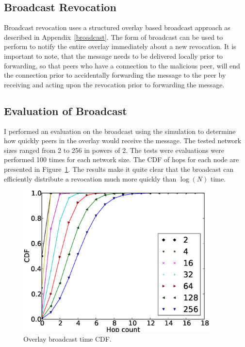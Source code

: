 \subsection{Broadcast Revocation}

Broadcast revocation uses a structured overlay based broadcast approach as
described in Appendix~\ref{broadcast}.  The form of broadcast can be used to
perform to notify the entire overlay immediately about a new revocation.  It is
important to note, that the message needs to be delivered locally prior to
forwarding, so that peers who have a connection to the malicious peer, will end
the connection prior to accidentally forwarding the message to the peer by
receiving and acting upon the revocation prior to forwarding the message.  

\subsection{Evaluation of Broadcast}

I performed an evaluation on the broadcast using the simulation to determine
how quickly peers in the overlay would receive the message.  The tested network
sizes ranged from 2 to 256 in powers of 2.  The tests were evaluations were
performed 100 times for each network size.  The CDF of hops for each node are
presented in Figure~\ref{fig:broadcast_cdf}.  The results make it quite clear that
the broadcast can efficiently distribute a revocation much more quickly than
$\log(N)$ time.

\begin{figure}[ht]
\centering
\includegraphics[width=4in]{figs/broadcast.eps}
\caption[Overlay broadcast time]{Overlay broadcast time CDF.}
\label{fig:broadcast_cdf}
\end{figure}

